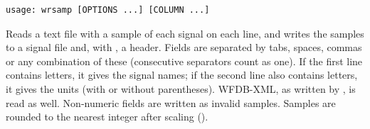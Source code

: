 \begin{lstlisting}[style=signature,language={}]
usage: wrsamp [OPTIONS ...] [COLUMN ...]
\end{lstlisting}
Reads a text file with a sample of each signal on each line, and writes the samples to a
signal file and, with , a header. Fields are separated by tabs, spaces, commas or
any combination of these (consecutive separators count as one). If the first line contains
letters, it gives the signal names; if the second line also contains letters, it gives the
units (with or without parentheses). WFDB-XML, as written by , is read as
well. Non-numeric fields are written as invalid samples. Samples are rounded to the nearest
integer after scaling ().
